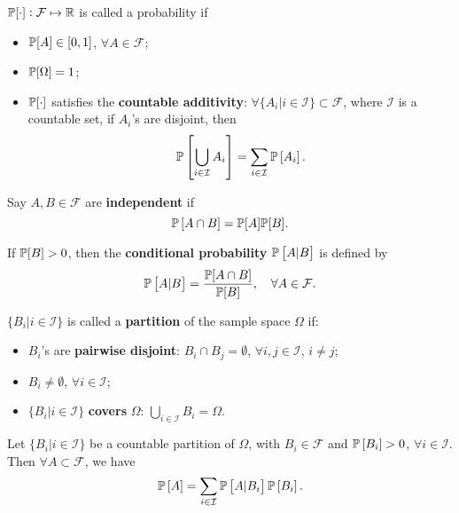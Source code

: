 \begin{definition}[Probability]
    $\mathbb{P}[\cdot]: \mathcal{F} \mapsto \mathbb{R}$ is called a probability if
    \begin{itemize}
        \item $\mathbb{P}[A] \in [0,1]$, $\forall A \in \mathcal{F}$;
        \item $\mathbb{P}[\Omega] = 1$;
        \item $\mathbb{P}[\cdot]$ satisfies the \textbf{countable additivity}: $\forall \{A_i | i \in \mathcal{I} \} \subset \mathcal{F}$, where $\mathcal{I}$ is a countable set, if $A_i$'s are disjoint, then 
        \begin{equation*}
            \mathbb{P} \left[ \bigcup_{i \in \mathcal{I}} A_i \right] = \sum_{i \in \mathcal{I}} \mathbb{P} \left[A_i\right].
        \end{equation*}
    \end{itemize}
\end{definition}

\begin{definition}[Independence]
    Say $A, B \in \mathcal{F}$ are \textbf{independent} if
    \begin{equation*}
        \mathbb{P} \left[ A \cap B \right] = \mathbb{P} [A] \mathbb{P} [B].
    \end{equation*}
\end{definition}

\begin{definition}
    If $\mathbb{P} [B] > 0$, then the \textbf{conditional probability} $\mathbb{P} \left[ A | B \right]$ is defined by 
    \begin{equation*}
        \mathbb{P} \left[ A | B \right] = \frac{\mathbb{P} [A \cap B]}{\mathbb{P} [B]}, \quad \forall A \in \mathcal{F}.
    \end{equation*}
\end{definition}

\begin{definition}[Partitions]
    $\{ B_i | i \in \mathcal{I} \}$ is called a \textbf{partition} of the sample space $\Omega$ if:
    \begin{itemize}
        \item $B_i$'s are \textbf{pairwise disjoint}: $B_i \cap B_j = \emptyset$, $\forall i, j \in \mathcal{I}$, $i \neq j$;
        \item $B_i \neq \emptyset$, $\forall i \in \mathcal{I}$;
        \item $\{ B_i | i \in \mathcal{I} \}$ \textbf{covers} $\Omega$: $\bigcup_{i\in \mathcal{I}} B_i = \Omega$.
    \end{itemize}
\end{definition}

\begin{theorem}
    Let $\{ B_i | i \in \mathcal{I} \}$ be a countable partition of $\Omega$, with $B_i \in \mathcal{F}$ and $\mathbb{P} \left[ B_i \right] > 0$, $\forall i \in \mathcal{I}$. Then $\forall A \subset \mathcal{F}$, we have 
    \begin{equation*}
        \mathbb{P} \left[ A \right] = \sum_{i \in \mathcal{I}} \mathbb{P} \left[ A | B_i \right] \mathbb{P} \left[ B_i \right].
    \end{equation*}
\end{theorem}
